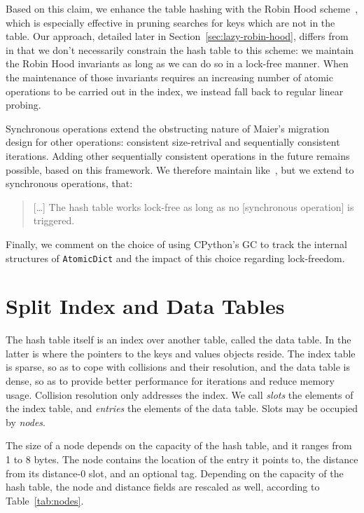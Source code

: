 Based on this claim, we enhance the table hashing with the Robin Hood scheme~\cite{robin-hood,bolt}, which is especially effective in pruning searches for keys which are not in the table.
Our approach, detailed later in Section~\ref{sec:lazy-robin-hood}, differs from~\cite{bolt} in that we don't necessarily constrain the hash table to this scheme: we maintain the Robin Hood invariants as long as we can do so in a lock-free manner.
When the maintenance of those invariants requires an increasing number of atomic operations to be carried out in the index, we instead fall back to regular linear probing.

Synchronous operations extend the obstructing nature of Maier's migration design for other operations: consistent size-retrival and sequentially consistent iterations.
Adding other sequentially consistent operations in the future remains possible, based on this framework.
We therefore maintain like~\cite{maier}, but we extend to synchronous operations, that:
\begin{quote}
[\ldots]
    The hash table works lock-free as long as no [synchronous operation] is triggered.
\end{quote}

Finally, we comment on the choice of using CPython's GC to track the internal structures of \texttt{AtomicDict} and the impact of this choice regarding lock-freedom.


\section{Split Index and Data Tables}\label{sec:python-dict}

The hash table itself is an index over another table, called the data table.
In the latter is where the pointers to the keys and values objects reside.
The index table is sparse, so as to cope with collisions and their resolution, and the data table is dense, so as to provide better performance for iterations and reduce memory usage.
Collision resolution only addresses the index.
We call \emph{slots} the elements of the index table, and \emph{entries} the elements of the data table.
Slots may be occupied by \emph{nodes}.

The size of a node depends on the capacity of the hash table, and it ranges from 1 to 8 bytes.
The node contains the location of the entry it points to, the distance from its distance-0 slot, and an optional tag.
Depending on the capacity of the hash table, the node and distance fields are rescaled as well, according to Table~\ref{tab:nodes}.

